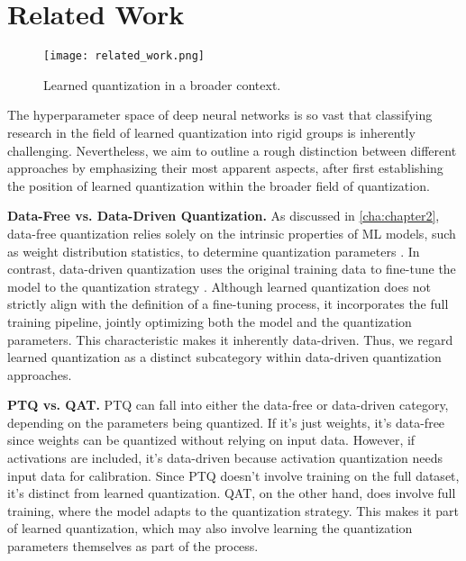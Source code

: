 \chapter{Related Work\label{cha:chapter5}}

\hspace*{1em}
\begin{figure}[b!]
    \centering
    \texttt{[image: related\_work.png]}
    \caption{ Learned quantization in a broader context.}
    \label{fig:related_work}
  \end{figure}
  
The hyperparameter space of deep neural networks is so vast
that classifying research in the field of learned quantization into rigid groups
is inherently challenging.
Nevertheless, we aim to outline a rough distinction
between different approaches by emphasizing their most apparent aspects,
after first establishing the position of learned quantization within the broader field of quantization.

\textbf{Data-Free vs. Data-Driven Quantization.}
As discussed in \cref{cha:chapter2}, 
data-free quantization relies solely on the intrinsic properties of ML models, 
such as weight distribution statistics, to determine quantization parameters \cite{DBLP:conf/iccv/NagelBBW19}. 
In contrast, data-driven quantization uses the original training data to fine-tune the model to the quantization strategy \cite{Edouard2022SPIQ}. 
Although learned quantization does not strictly align with the definition of a fine-tuning process, 
it incorporates the full training pipeline, jointly optimizing both the model and the quantization parameters. 
This characteristic makes it inherently data-driven. 
Thus, we regard learned quantization as a distinct subcategory within data-driven quantization approaches.

\textbf{PTQ vs. QAT.}
PTQ \cite{DBLP:conf/icmcs/ZhuZL18} can fall into either the data-free or data-driven category, depending on the parameters being quantized. 
If it’s just weights, it’s data-free since weights can be quantized without relying on input data. 
However, if activations are included, it’s data-driven because activation quantization needs input data for calibration. 
Since PTQ doesn’t involve training on the full dataset, it’s distinct from learned quantization.
QAT, on the other hand, does involve full training, where the model adapts to the quantization strategy. 
This makes it part of learned quantization, which may also involve learning the quantization parameters themselves as part of the process.

